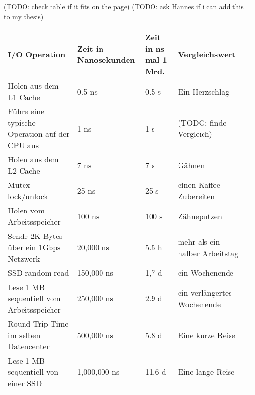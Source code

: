 (TODO: check table if it fits on the page)
(TODO: ask Hannes if i can add this to my thesis)

\begin{table}[h]
\begin{tabular}{@{}lllll@{}}
\toprule
\textbf{I/O Operation}                                     & \textbf{Zeit in Nanosekunden} & \textbf{Zeit in ns mal 1 Mrd.} & \textbf{Vergleichswert}                                    &  \\ \midrule
Holen aus dem L1 Cache                                     & 0.5 ns                        & 0.5 s                          & Ein Herzschlag                                             &  \\
Führe eine typische Operation auf der CPU aus              & 1 ns                          & 1 s                            & (TODO: finde Vergleich)                                    &  \\
Holen aus dem L2 Cache                                     & 7 ns                          & 7 s                            & Gähnen                                                     &  \\
Mutex lock/unlock                                          & 25 ns                         & 25 s                           & einen Kaffee Zubereiten                                    &  \\
Holen vom Arbeitsspeicher                                  & 100 ns                        & 100 s                          & Zähneputzen                                                &  \\
Sende 2K Bytes über ein 1Gbps Netzwerk                     & 20,000 ns                     & 5.5 h                          & mehr als ein halber Arbeitstag                             &  \\
SSD random read                                            & 150,000 ns                    & 1,7 d                          & ein Wochenende                                             &  \\
Lese 1 MB sequentiell vom Arbeitsspeicher                  & 250,000 ns                    & 2.9 d                          & ein verlängertes Wochenende                                &  \\
Round Trip Time im selben Datencenter                      & 500,000 ns                    & 5.8 d                          & Eine kurze Reise                                           &  \\
Lese 1 MB sequentiell von einer SSD                        & 1,000,000 ns                  & 11.6 d                         & Eine lange Reise                                           &  \\

\end{tabular}
\end{table}
